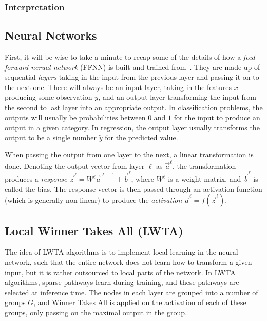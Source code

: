     \subsubsection{Interpretation}


     

\subsection{Neural Networks}
    First, it will be wise to take a minute to recap some of the details of how a \textit{feed-forward nerual network} (FFNN) is built and trained from~\cite{Project2}. They are made up of sequential \textit{layers} taking in the input from the previous layer and passing it on to the next one. There will always be an input layer, taking in the features $x$ producing some observation $y$, and an output layer transforming the input from the second to last layer into an appropriate output. In classification problems, the outputs will usually be probabilities between $0$ and $1$ for the input to produce an output in a given category. In regression, the output layer usually transforms the output to be a single number $\tilde{y}$ for the predicted value.

    When passing the output from one layer to the next, a linear transformation is done. Denoting the output vector from layer $\ell$ as $\vec{a}^\ell$, the transformation produces a \textit{response} $\vec{z}^{\ell} = W^\ell \vec{a}^{\ell-1} + \vec{b}^\ell$, where $W^\ell$ is a weight matrix, and $\vec{b}^\ell$ is called the bias. The response vector is then passed through an activation function (which is generally non-linear) to produce the \textit{activation} $\vec{a}^\ell = f(\vec{z}^\ell)$.

\subsection{Local Winner Takes All (LWTA)}
    The idea of LWTA algorithms is to implement local learning in the neural network, such that the entire network does not learn how to transform a given input, but it is rather outsourced to local parts of the network. In LWTA algorithms, sparse pathways learn during training, and these pathways are selected at inference time. The nodes in each layer are grouped into a number of groups $G$, and Winner Takes All is applied on the activation of each of these groups, only passing on the maximal output in the group.

